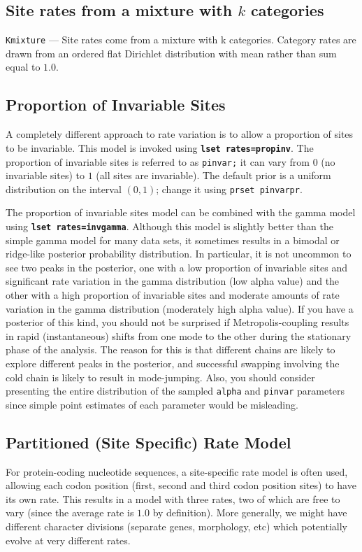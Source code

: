\documentclass[12pt]{book}
\newcommand{\ttt}[1]{\texttt{#1}}
\newcommand{\tb}[1]{\ttt{\textbf{#1}}}
\begin{document}
\subsection{Site rates from a mixture with $k$ categories}
\ttt{Kmixture} --- Site rates come from a mixture with k categories. Category rates are drawn from
an ordered flat Dirichlet distribution with mean rather than sum equal to $1.0$. 

\subsection{Proportion of Invariable Sites}
A completely different approach to rate variation is to allow a proportion of sites to be
invariable. This model is invoked using \tb{lset rates=propinv}. The proportion of invariable sites
is referred to as \ttt{pinvar;} it can vary from $0$ (no invariable sites) to $1$ (all sites are
invariable). The default prior is a uniform distribution on the interval $(0,1)$; change it using
\ttt{prset pinvarpr}.

The proportion of invariable sites model can be combined with the gamma model using \tb{lset
rates=invgamma}. Although this model is slightly better than the simple gamma model for many data
sets, it sometimes results in a bimodal or ridge-like posterior probability distribution. In
particular, it is not uncommon to see two peaks in the posterior, one with a low proportion of
invariable sites and significant rate variation in the gamma distribution (low alpha value) and the
other with a high proportion of invariable sites and moderate amounts of rate variation in the
gamma distribution (moderately high alpha value). If you have a posterior of this kind, you should
not be surprised if Metropolis-coupling results in rapid (instantaneous) shifts from one mode to
the other during the stationary phase of the analysis. The reason for this is that different chains
are likely to explore different peaks in the posterior, and successful swapping involving the cold
chain is likely to result in mode-jumping. Also, you should consider presenting the entire
distribution of the sampled \ttt{alpha} and \ttt{pinvar} parameters since simple point estimates of
each parameter would be misleading.

\subsection{Partitioned (Site Specific) Rate Model}
For protein-coding nucleotide sequences, a site-specific rate model is often used, allowing each
codon position (first, second and third codon position sites) to have its own rate. This results in
a model with three rates, two of which are free to vary (since the average rate is $1.0$ by
definition). More generally, we might have different character divisions (separate genes,
morphology, etc) which potentially evolve at very different rates.
\end{document}
